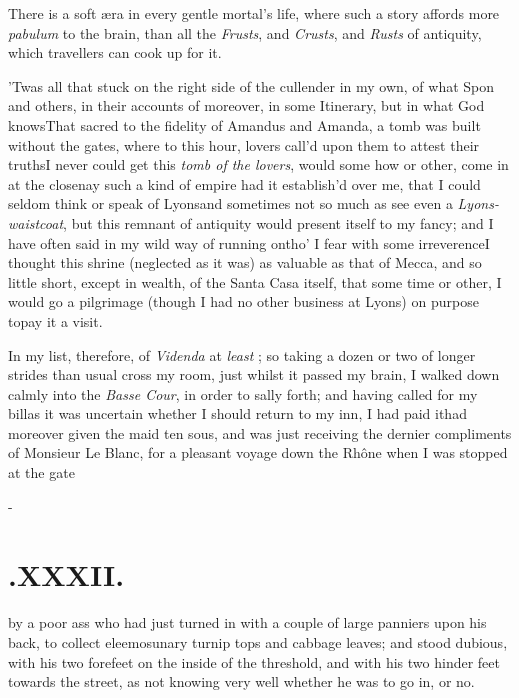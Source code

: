 \documentclass{article}
\begin{document}
There is a soft æra in every gentle mortal’s life,
where such a story affords more \textit{pabulum} to the brain, than
all the \textit{Frusts}, and \textit{Crusts}, and \textit{Rusts} of
antiquity, which travellers can cook up for it.

\tsh ’Twas all that stuck on the right\break
side of the cullender in my own, of what Spon
and others, in their accounts of 
moreover, in some Itinerary, but in what God knows\tsk That sacred to the fidelity
of Amandus and Amanda, a tomb was built without the gates, where to this hour,
lovers call’d upon them to
attest their truths\tsk I never could get
this \textit{tomb of the lovers}, would some how or
other, come in at the close\tsk nay such a kind of empire had it establish’d over me,
that I could seldom think or speak of Lyons\tsk and sometimes not so much as see even
a \textit{Lyons-waistcoat}, but this remnant of antiquity would present itself to my
fancy; and I have often said in my wild way of running on\tsk tho’ I fear with some
irreverence\tsk \lqq I thought this shrine (neglected as it was) as valuable as that of
Mecca, and so little short, except in wealth, of the Santa Casa itself, that some
time or other, I would go a pilgrimage (though I had no other business at Lyons) on
purpose to\break pay it a visit.

In my list, therefore, of \textit{Videnda} at 
\textit{least} ; so taking a dozen or two of longer strides than usual
cross my room, just whilst it passed my brain, I walked down calmly into the
\textit{Basse Cour}, in order to sally forth; and having called for my bill\tsk as it
was uncertain whether I should return to my inn, I had paid it\tsh had moreover
given the maid ten sous, and was just receiving the dernier compliments of Monsieur
Le Blanc, for a\break
pleasant voyage down the Rhône\tsh\break
when I was stopped at the gate\tsh

\vfill{}\eject
\null\kern-\baselineskip
\section{.\enspace XXXII.}

 by a poor ass who had\break
just turned in with a couple\break
of large panniers upon his back, to collect eleemosunary turnip
tops and cabbage leaves; and stood dubious, with his two
forefeet on the inside of the threshold, and with his two
hinder feet towards the street, as not knowing very well whether
he was to go in, or no.
\end{document}
